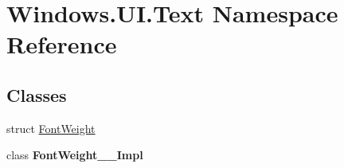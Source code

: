 \hypertarget{namespace_windows_1_1_u_i_1_1_text}{}\section{Windows.\+U\+I.\+Text Namespace Reference}
\label{namespace_windows_1_1_u_i_1_1_text}
\subsection*{Classes}
\begin{DoxyCompactItemize}
\item 
struct \hyperlink{struct_windows_1_1_u_i_1_1_text_1_1_font_weight}{Font\+Weight}
\item 
class {\bfseries Font\+Weight\+\_\+\+\_\+\+Impl}
\end{DoxyCompactItemize}
